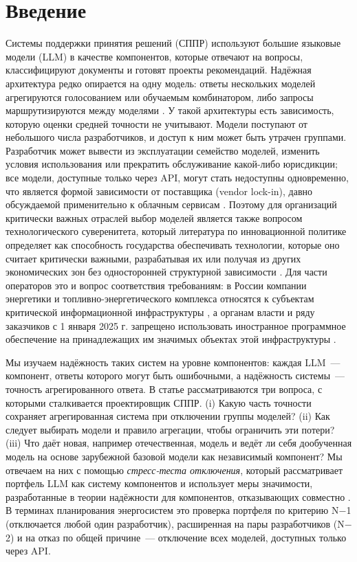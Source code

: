 \documentclass[preprint,12pt,authoryear]{elsarticle}
\begin{document}
\linenumbers

\section{Введение}

Системы поддержки принятия решений (СППР) используют большие языковые модели (LLM) в качестве компонентов, которые отвечают на вопросы, классифицируют документы и готовят проекты рекомендаций. Надёжная архитектура редко опирается на одну модель: ответы нескольких моделей агрегируются голосованием или обучаемым комбинатором, либо запросы маршрутизируются между моделями \citep{jiang2023blender,wang2025moa,chen2024frugalgpt,ong2025routellm}. У такой архитектуры есть зависимость, которую оценки средней точности не учитывают. Модели поступают от небольшого числа разработчиков, и доступ к ним может быть утрачен группами. Разработчик может вывести из эксплуатации семейство моделей, изменить условия использования или прекратить обслуживание какой-либо юрисдикции; все модели, доступные только через API, могут стать недоступны одновременно, что является формой зависимости от поставщика (vendor lock-in), давно обсуждаемой применительно к облачным сервисам \citep{oparamartins2016}. Поэтому для организаций критически важных отраслей выбор моделей является также вопросом технологического суверенитета, который литература по инновационной политике определяет как способность государства обеспечивать технологии, которые оно считает критически важными, разрабатывая их или получая из других экономических зон без односторонней структурной зависимости \citep{edler2023}. Для части операторов это и вопрос соответствия требованиям: в России компании энергетики и топливно-энергетического комплекса относятся к субъектам критической информационной инфраструктуры \citep{fz187}, а органам власти и ряду заказчиков с 1 января 2025 г. запрещено использовать иностранное программное обеспечение на принадлежащих им значимых объектах этой инфраструктуры \citep{ukaz166}.

Мы изучаем надёжность таких систем на уровне компонентов: каждая LLM~--- компонент, ответы которого могут быть ошибочными, а надёжность системы~--- точность агрегированного ответа. В статье рассматриваются три вопроса, с которыми сталкивается проектировщик СППР. (i) Какую часть точности сохраняет агрегированная система при отключении группы моделей? (ii) Как следует выбирать модели и правило агрегации, чтобы ограничить эти потери? (iii) Что даёт новая, например отечественная, модель и ведёт ли себя дообученная модель на основе зарубежной базовой модели как независимый компонент? Мы отвечаем на них с помощью \emph{стресс-теста отключения}, который рассматривает портфель LLM как систему компонентов и использует меры значимости, разработанные в теории надёжности для компонентов, отказывающих совместно \citep{birnbaum1969,vesely1983,borgonovo2001,honglie1993}. В терминах планирования энергосистем это проверка портфеля по критерию N$-$1 (отключается любой один разработчик), расширенная на пары разработчиков (N$-$2) и на отказ по общей причине~--- отключение всех моделей, доступных только через API.
\end{document}
